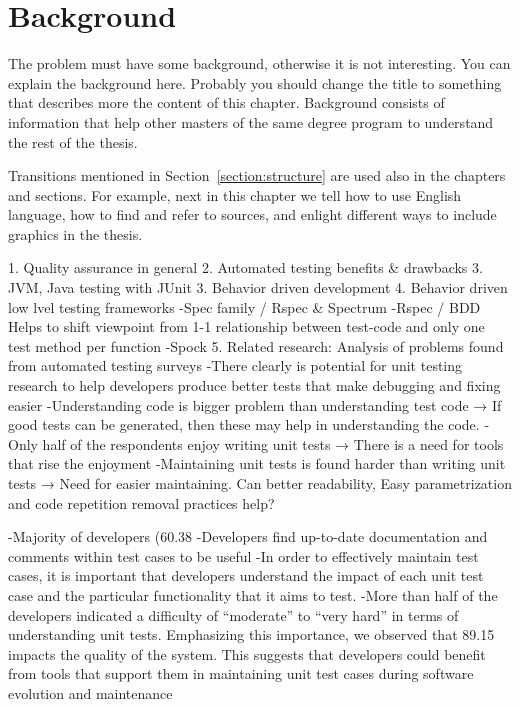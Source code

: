 \chapter{Background}
\label{chapter:background} 

The problem must have some background, otherwise it is not
interesting.  You can explain the background here. Probably you should
change the title to something that describes more the content of this
chapter. Background consists of information that help other masters of
the same degree program to understand the rest of the thesis.

Transitions mentioned in Section~\ref{section:structure} are used also
in the chapters and sections. For example, next in this chapter we
tell how to use English language, how to find and refer to sources,
and enlight different ways to include graphics in the thesis.

1. Quality assurance in general
2. Automated testing benefits & drawbacks
3. JVM, Java testing with JUnit
3. Behavior driven development
4. Behavior driven low lvel testing frameworks
    -Spec family / Rspec & Spectrum
            -Rspec / BDD Helps to shift viewpoint from 1-1 relationship between test-code and only one test method per function
    -Spock
5. Related research: Analysis of problems found from automated testing surveys
    -There clearly is potential for unit testing research to help developers produce better tests that make debugging and fixing easier
    -Understanding code is bigger problem than understanding test code
    → If good tests can be generated, then these may help in understanding the code.
    -Only half of the respondents enjoy writing unit tests
    → There is a need for tools that rise the enjoyment
    -Maintaining unit tests is found harder than writing unit tests
    → Need for easier maintaining. Can better readability, Easy parametrization and code repetition removal practices help?

    -Majority of developers (60.38%
    -Developers find up-to-date documentation and comments within test cases to be useful
    -In order to effectively maintain test cases, it is important that developers understand the impact of each unit test case and the particular functionality that it aims to test.
    -More than half of the developers indicated a difficulty of “moderate” to “very hard” in terms of understanding unit tests.
     Emphasizing this importance, we observed that 89.15%
      impacts the quality of the system. This suggests that developers could benefit from tools that support them in maintaining unit test
       cases during software evolution and maintenance

